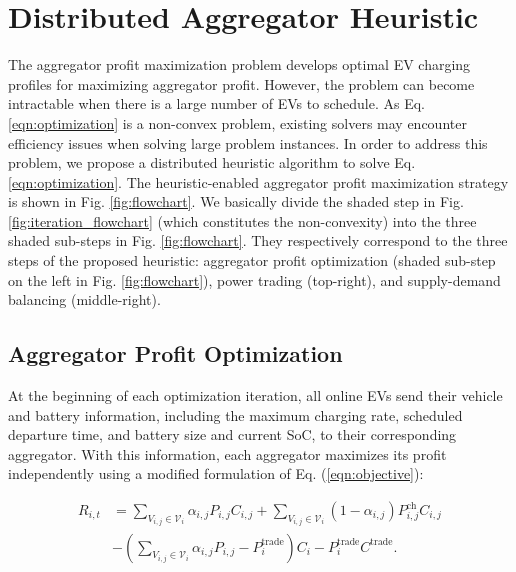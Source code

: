\documentclass[conference]{IEEEtran}
\begin{document}
	\vspace*{-0.1cm}
	\section{Distributed Aggregator Heuristic}
	\vspace*{-0.1cm}
		
	The aggregator profit maximization problem develops optimal EV charging profiles for maximizing aggregator profit. However, the problem can become intractable when there is a large number of EVs to schedule. As Eq. \eqref{eqn:optimization} is a non-convex problem, existing solvers may encounter efficiency issues when solving large problem instances. In order to address this problem, we propose a distributed heuristic algorithm to solve Eq. \eqref{eqn:optimization}. The heuristic-enabled aggregator profit maximization strategy is shown in Fig. \ref{fig:flowchart}. We basically divide the shaded step in Fig. \ref{fig:iteration_flowchart} (which constitutes the non-convexity) into the three shaded sub-steps in Fig. \ref{fig:flowchart}. They respectively correspond to the three steps of the proposed heuristic: aggregator profit optimization (shaded sub-step on the left in Fig. \ref{fig:flowchart}), power trading (top-right), and supply-demand balancing (middle-right).
	
\vspace{-0.3cm}
	\subsection{Aggregator Profit Optimization}
	\vspace{-0.2cm}


	At the beginning of each optimization iteration, all online EVs send their vehicle and battery information, including the maximum charging rate, scheduled departure time, and battery size and current SoC, to their corresponding aggregator. With this information, each aggregator maximizes its profit independently using a modified formulation of Eq. (\ref{eqn:objective}):

\vspace{-0.3cm}
	{\small\begin{align}\label{eqn:aggregator_profit}
	R_{i, t} & = \sum_{V_{i,j}\in\mathcal{V}_i}\alpha_{i,j}P_{i,j}C_{i,j} + \sum_{V_{i,j}\in\mathcal{V}_i}(1 - \alpha_{i,j})P^\text{ch}_{i,j}C_{i,j} \nonumber \\
	& - (\sum_{V_{i,j}\in\mathcal{V}_i}\alpha_{i,j}P_{i,j} - P^\text{trade}_i)C_i - P^\text{trade}_iC^\text{trade}.
	\end{align}}
\vspace{-0.2cm}
	
\end{document}
